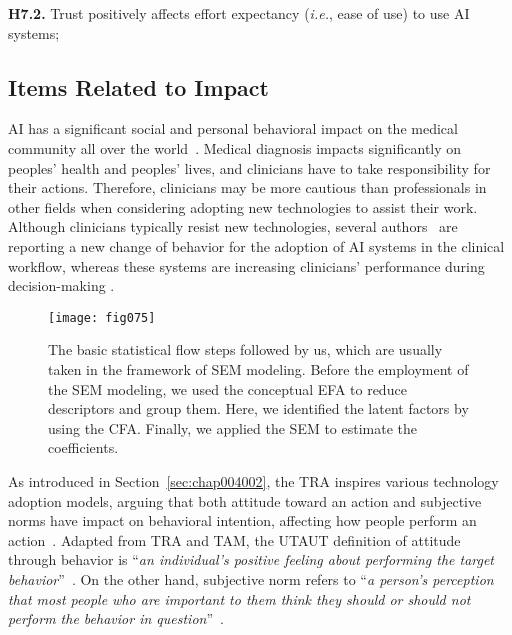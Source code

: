 \vspace{2.25mm}

\noindent
{\bf H7.2.} Trust positively affects effort expectancy ({\it i.e.}, ease of use) to use AI systems;

\subsection{Items Related to Impact}
\label{sec:chap004003003}

AI has a significant social and personal behavioral impact on the medical community all over the world~\cite{Fan2020}.
Medical diagnosis impacts significantly on peoples' health and peoples' lives, and clinicians have to take responsibility for their actions.
Therefore, clinicians may be more cautious than professionals in other fields when considering adopting new technologies to assist their work.
Although clinicians typically resist new technologies, several authors~\cite{doi:10.1148/ryai.2020190043, WAYMEL2019327} are reporting a new change of behavior for the adoption of AI systems in the clinical workflow, whereas these systems are increasing clinicians' performance during decision-making \cite{CALISTO2021102607}.

\begin{figure*}
\centering
\texttt{[image: fig075]}
\caption{The basic statistical flow steps followed by us, which are usually taken in the framework of SEM modeling. Before the employment of the SEM modeling, we used the conceptual EFA to reduce descriptors and group them. Here, we identified the latent factors by using the CFA. Finally, we applied the SEM to estimate the coefficients.}
\label{fig:fig075}
\end{figure*}

As introduced in Section~\ref{sec:chap004002}, the TRA inspires various technology adoption models, arguing that both attitude toward an action and subjective norms have impact on behavioral intention, affecting how people perform an action~\cite{https://doi.org/10.1002/hbe2.195}.
Adapted from TRA and TAM, the UTAUT definition of attitude through behavior is ``{\it an individual's positive feeling about performing the target behavior}''~\cite{10.2307/30036540}.
On the other hand, subjective norm refers to ``{\it a person's perception that most people who are important to them think they should or should not perform the behavior in question}''~\cite{10.2307/30036540}.

